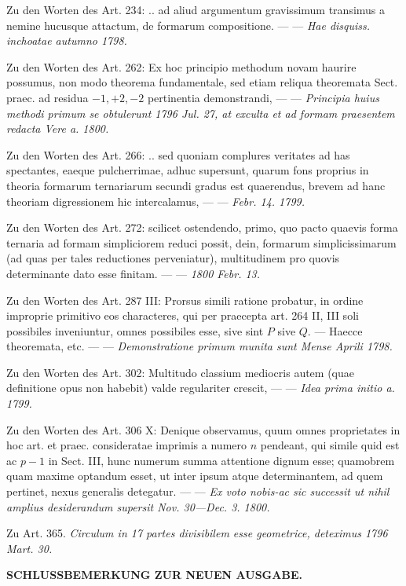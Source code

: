 Zu den Worten des Art. 234: .. ad aliud argumentum gravissimum transimus a nemine hucusque attactum, de formarum compositione. — — \textit{Hae disquiss. inchoatae autumno 1798.}


Zu den Worten des Art. 262: Ex hoc principio methodum novam haurire possumus, non modo theorema fundamentale, sed etiam reliqua theoremata Sect. praec. ad residua \(-1,\allowbreak +2,\allowbreak -2\) pertinentia demonstrandi, — — \textit{Principia huius methodi primum se obtulerunt 1796 Jul. 27, at exculta et ad formam praesentem redacta Vere a. 1800.}


Zu den Worten des Art. 266: .. sed quoniam complures veritates ad has spectantes, eaeque pulcherrimae, adhuc supersunt, quarum fons proprius in theoria formarum ternariarum secundi gradus est quaerendus, brevem ad hanc theoriam digressionem hic intercalamus, — — \textit{Febr. 14. 1799.}


Zu den Worten des Art. 272: scilicet ostendendo, primo, quo pacto quaevis forma ternaria ad formam simpliciorem reduci possit, dein, formarum simplicissimarum (ad quas per tales reductiones perveniatur), multitudinem pro quovis determinante dato esse finitam. — — \textit{1800 Febr. 13.}


Zu den Worten des Art. 287 III: Prorsus simili ratione probatur, in ordine improprie primitivo eos characteres, qui per praecepta art. 264 II, III soli possibiles inveniuntur, omnes possibiles esse, sive sint \(P\) sive \(Q\). — Haecce theoremata, etc. — — \textit{Demonstratione primum munita sunt Mense Aprili 1798.}


Zu den Worten des Art. 302: Multitudo classium mediocris autem (quae definitione opus non habebit) valde regulariter crescit, — — \textit{Idea prima initio a. 1799.}


Zu den Worten des Art. 306 X: Denique observamus, quum omnes proprietates in hoc art. et praec. consideratae imprimis a numero \(n\) pendeant, qui simile quid est ac \(p-1\) in Sect. III, hunc numerum summa attentione dignum esse; quamobrem quam maxime optandum esset, ut inter ipsum atque determinantem, ad quem pertinet, nexus generalis detegatur. — — \textit{Ex voto nobis-ac sic successit ut nihil amplius desiderandum supersit Nov. 30—Dec. 3. 1800.}


Zu Art. 365. \textit{Circulum in 17 partes divisibilem esse geometrice, deteximus 1796 Mart. 30.}


\clearpage
{}
\begin{center}\bfseries SCHLUSSBEMERKUNG ZUR NEUEN AUSGABE.\end{center}

